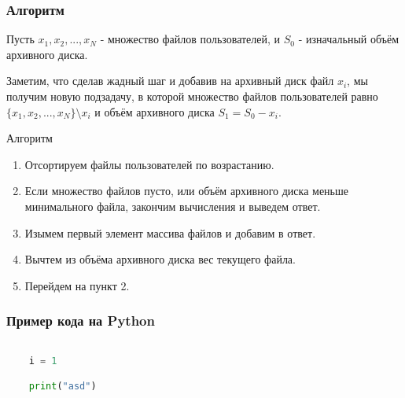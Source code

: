 \documentclass{beamer}
\begin{document}
\begin{frame}

    \frametitle{Алгоритм}

    Пусть $x_1, x_2, ... , x_N$ - множество файлов пользователей, и $S_0$ - изначальный объём архивного диска.

    Заметим, что сделав жадный шаг и добавив на архивный диск файл $x_i$, мы получим новую подзадачу, в которой множество файлов пользователей равно $\{x_1, x_2, ... , x_N\} \setminus x_i$ и объём архивного диска $S_1 = S_0 - x_i$. 

    \begin{alertblock}{Алгоритм}

        \begin{enumerate}

            \item Отсортируем файлы пользователей по возрастанию.

            \item Если множество файлов пусто, или объём архивного диска меньше минимального файла, закончим вычисления и выведем ответ.

            \item Изымем первый элемент массива файлов и добавим в ответ.

            \item Вычтем из объёма архивного диска вес текущего файла.

            \item Перейдем на пункт 2.

        \end{enumerate}

    \end{alertblock}

\end{frame}

\begin{frame}[fragile]

    \frametitle{Пример кода на Python}

    \begin{lstlisting}[language=Python, keywordstyle=\color{red}]

    i = 1

    print("asd")

    \end{lstlisting}

\end{frame}
\end{document}
